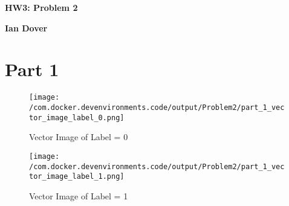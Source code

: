 \documentclass{article}%
\begin{document}
%
\normalsize%
\pagestyle{header}%
\begin{minipage}{\textwidth}%
\centering%
\begin{Large}%
\textbf{HW3: Problem 2}%
\end{Large}%
\linebreak%
\begin{large}%
\textbf{Ian Dover}%
\end{large}%
\end{minipage}%
\section{Part 1}%
\label{sec:Part1}%


\begin{figure}[h!]%
\centering%
\texttt{[image: /com.docker.devenvironments.code/output/Problem2/part\_1\_vector\_image\_label\_0.png]}%
\caption{Vector Image of Label = 0}%
\end{figure}

%


\begin{figure}[h!]%
\centering%
\texttt{[image: /com.docker.devenvironments.code/output/Problem2/part\_1\_vector\_image\_label\_1.png]}%
\caption{Vector Image of Label = 1}%
\end{figure}

%
\end{document}
